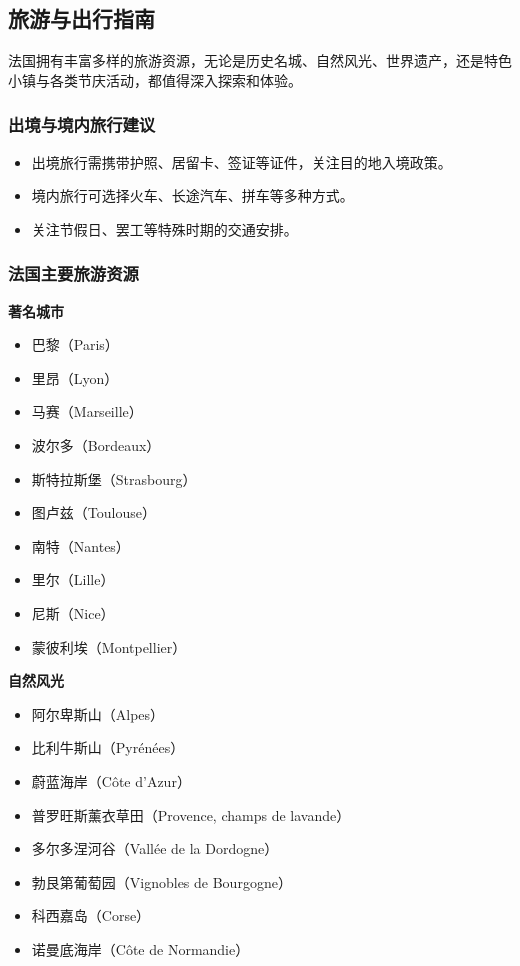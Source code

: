 \subsection{旅游与出行指南}

法国拥有丰富多样的旅游资源，无论是历史名城、自然风光、世界遗产，还是特色小镇与各类节庆活动，都值得深入探索和体验。

\subsubsection{出境与境内旅行建议}
\begin{itemize}
    \item 出境旅行需携带护照、居留卡、签证等证件，关注目的地入境政策。
    \item 境内旅行可选择火车、长途汽车、拼车等多种方式。
    \item 关注节假日、罢工等特殊时期的交通安排。
\end{itemize}

\subsubsection{法国主要旅游资源}
\textbf{著名城市}
\begin{itemize}
    \item 巴黎（Paris）
    \item 里昂（Lyon）
    \item 马赛（Marseille）
    \item 波尔多（Bordeaux）
    \item 斯特拉斯堡（Strasbourg）
    \item 图卢兹（Toulouse）
    \item 南特（Nantes）
    \item 里尔（Lille）
    \item 尼斯（Nice）
    \item 蒙彼利埃（Montpellier）
\end{itemize}

\textbf{自然风光}
\begin{itemize}
    \item 阿尔卑斯山（Alpes）
    \item 比利牛斯山（Pyrénées）
    \item 蔚蓝海岸（Côte d’Azur）
    \item 普罗旺斯薰衣草田（Provence, champs de lavande）
    \item 多尔多涅河谷（Vallée de la Dordogne）
    \item 勃艮第葡萄园（Vignobles de Bourgogne）
    \item 科西嘉岛（Corse）
    \item 诺曼底海岸（Côte de Normandie）
\end{itemize}

